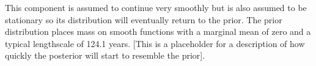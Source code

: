 This component is assumed to continue very smoothly but is also assumed to be stationary so its distribution will eventually return to the prior.
The prior distribution places mass on smooth functions with a marginal mean of zero and a typical lengthscale of 124.1 years.
[This is a placeholder for a description of how quickly the posterior will start to resemble the prior].